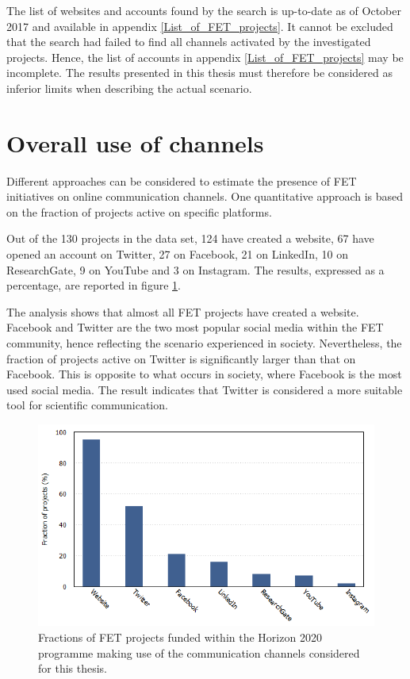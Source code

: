 The list of websites and accounts found by the search is up-to-date as of October 2017 and available in appendix \ref{List_of_FET_projects}. It cannot be excluded that the search had failed to find all channels activated by the investigated projects. Hence, the list of accounts in appendix \ref{List_of_FET_projects} may be incomplete. The results presented in this thesis must therefore be considered as inferior limits when describing the actual scenario. 

\section{Overall use of channels} \label{Overall_use_of_channels}
Different approaches can be considered to estimate the presence of FET initiatives on online communication channels. One quantitative approach is based on the fraction of projects active on specific platforms.

Out of the 130 projects in the data set, 124 have created a website, 67 have opened an account on Twitter, 27 on Facebook, 21 on LinkedIn, 10 on ResearchGate, 9 on YouTube and 3 on Instagram. The results, expressed as a percentage, are reported in figure \ref{Social_media}.

The analysis shows that almost all FET projects have created a website. Facebook and Twitter are the two most popular social media within the FET community, hence reflecting the scenario experienced in society. Nevertheless, the fraction of projects active on Twitter is significantly larger than that on Facebook. This is opposite to what occurs in society, where Facebook is the most used social media. The result indicates that Twitter is considered a more suitable tool for scientific communication. 

\begin{figure}[!t] 
 \begin{center}
 \includegraphics[scale=0.45]{Images/Social_media.png}
 \caption{Fractions of FET projects funded within the Horizon 2020 programme making use of the communication channels considered for this thesis.}
 \label{Social_media}
 \end{center}
\end{figure}

